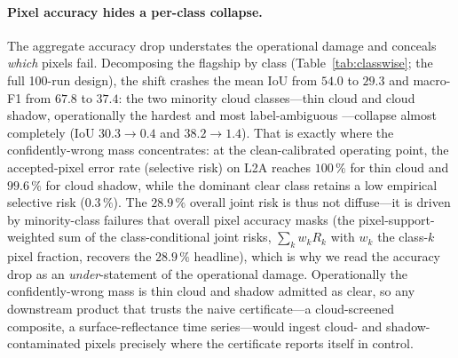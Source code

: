 \documentclass[preprint,3p,times]{elsarticle}
\begin{document}
\paragraph{Pixel accuracy hides a per-class collapse.} The aggregate accuracy drop understates the operational damage and conceals \emph{which} pixels fail. Decomposing the flagship by class (Table~\ref{tab:classwise}; the full 100-run design), the shift crashes the mean IoU from $54.0$ to $29.3$ and macro-F1 from $67.8$ to $37.4$: the two minority cloud classes---thin cloud and cloud shadow, operationally the hardest and most label-ambiguous \citep{aybar2022cloudsen12}---collapse almost completely (IoU $30.3\to0.4$ and $38.2\to1.4$). That is exactly where the confidently-wrong mass concentrates: at the clean-calibrated operating point, the accepted-pixel error rate (selective risk) on L2A reaches $100\,\%$ for thin cloud and $99.6\,\%$ for cloud shadow, while the dominant clear class retains a low empirical selective risk ($0.3\,\%$). The $28.9\,\%$ overall joint risk is thus not diffuse---it is driven by minority-class failures that overall pixel accuracy masks (the pixel-support-weighted sum of the class-conditional joint risks, $\sum_k w_k R_k$ with $w_k$ the class-$k$ pixel fraction, recovers the $28.9\,\%$ headline), which is why we read the accuracy drop as an \emph{under}-statement of the operational damage. Operationally the confidently-wrong mass is thin cloud and shadow admitted as clear, so any downstream product that trusts the naive certificate---a cloud-screened composite, a surface-reflectance time series---would ingest cloud- and shadow-contaminated pixels precisely where the certificate reports itself in control.
\end{document}
